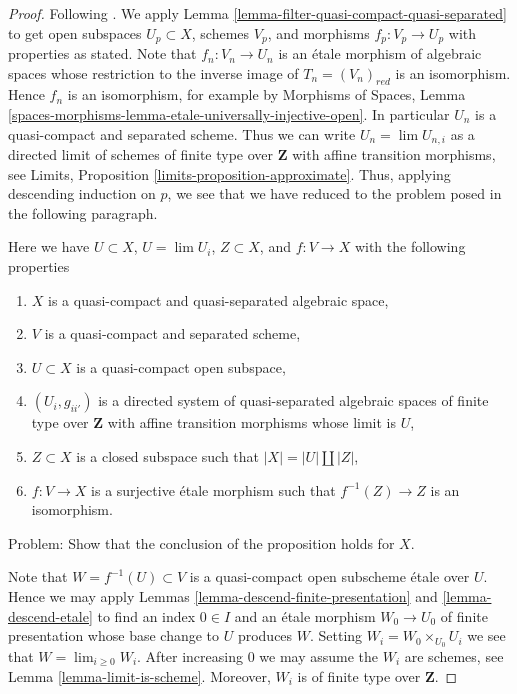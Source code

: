 \begin{proof}
Following \cite{CLO}. We apply Lemma
\ref{lemma-filter-quasi-compact-quasi-separated}
to get open subspaces $U_p \subset X$, schemes $V_p$, and morphisms
$f_p : V_p \to U_p$ with properties as stated. Note that
$f_n : V_n \to U_n$ is an \'etale morphism of algebraic spaces
whose restriction to the inverse image of $T_n = (V_n)_{red}$ is an
isomorphism. Hence $f_n$ is an isomorphism, for example by
Morphisms of Spaces, Lemma
\ref{spaces-morphisms-lemma-etale-universally-injective-open}.
In particular $U_n$ is a quasi-compact and separated scheme.
Thus we can write $U_n = \lim U_{n, i}$ as a directed limit
of schemes of finite type over $\mathbf{Z}$ with affine transition
morphisms, see Limits, Proposition \ref{limits-proposition-approximate}.
Thus, applying descending induction on $p$, we see that we have reduced
to the problem posed in the following paragraph.

\medskip\noindent
Here we have $U \subset X$, $U = \lim U_i$, $Z \subset X$, and
$f : V \to X$ with the following properties
\begin{enumerate}
\item $X$ is a quasi-compact and quasi-separated algebraic space,
\item $V$ is a quasi-compact and separated scheme,
\item $U \subset X$ is a quasi-compact open subspace,
\item $(U_i, g_{ii'})$ is a directed system of quasi-separated algebraic spaces
of finite type over $\mathbf{Z}$ with affine transition morphisms
whose limit is $U$,
\item $Z \subset X$ is a closed subspace such that $|X| = |U| \amalg |Z|$,
\item $f : V \to X$ is a surjective \'etale morphism such that
$f^{-1}(Z) \to Z$ is an isomorphism.
\end{enumerate}
Problem: Show that the conclusion of the proposition holds for $X$.

\medskip\noindent
Note that $W = f^{-1}(U) \subset V$ is a quasi-compact open subscheme
\'etale over $U$. Hence we may apply
Lemmas \ref{lemma-descend-finite-presentation} and \ref{lemma-descend-etale}
to find an index $0 \in I$ and an \'etale morphism $W_0 \to U_0$
of finite presentation whose base change to $U$ produces $W$. Setting
$W_i = W_0 \times_{U_0} U_i$ we see that $W = \lim_{i \geq 0} W_i$. After
increasing $0$ we may assume the $W_i$ are schemes, see
Lemma \ref{lemma-limit-is-scheme}.
Moreover, $W_i$ is of finite type over $\mathbf{Z}$.


\end{proof}
